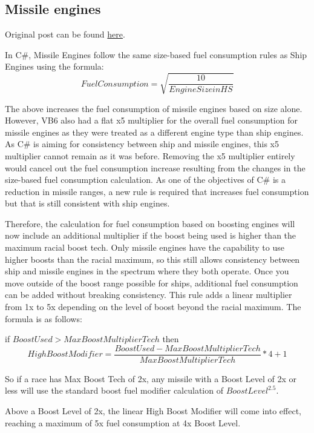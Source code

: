 \documentclass[../Aurora C# unofficial manual.tex]{subfiles}
\begin{document}
	
	\subsection{Missile engines}
	Original post can be found
	\href{http://aurora2.pentarch.org/index.php?topic=8495.msg102804#msg102804}{here}.
	\newline\newline
	
	In C\#, Missile Engines follow the same size-based fuel consumption rules as Ship Engines using the formula:
	\[ Fuel Consumption = \sqrt{\frac{10}{Engine Size in HS}} \]
	
	The above increases the fuel consumption of missile engines based on size alone. However, VB6 also had a flat x5 multiplier for the overall fuel consumption for missile engines as they were treated as a different engine type than ship engines. As C\# is aiming for consistency between ship and missile engines, this x5 multiplier cannot remain as it was before. Removing the x5 multiplier entirely would cancel out the fuel consumption increase resulting from the changes in the size-based fuel consumption calculation. As one of the objectives of C\# is a reduction in missile ranges, a new rule is required that increases fuel consumption but that is still consistent with ship engines.
	
	Therefore, the calculation for fuel consumption based on boosting engines will now include an additional multiplier if the boost being used is higher than the maximum racial boost tech. Only missile engines have the capability to use higher boosts than the racial maximum, so this still allows consistency between ship and missile engines in the spectrum where they both operate. Once you move outside of the boost range possible for ships, additional fuel consumption can be added without breaking consistency. This rule adds a linear multiplier from 1x to 5x depending on the level of boost beyond the racial maximum. The formula is as follows:\newline
	
	if \( Boost Used > Max Boost Multiplier Tech \) then
	\[ High Boost Modifier = \frac{Boost Used - Max Boost Multiplier Tech}{Max Boost Multiplier Tech} * 4 + 1 \]
	
	So if a race has Max Boost Tech of 2x, any missile with a Boost Level of 2x or less will use the standard boost fuel modifier calculation of \( Boost Level^{2.5} \).
	
	Above a Boost Level of 2x, the linear High Boost Modifier will come into effect, reaching a maximum of 5x fuel consumption at 4x Boost Level.
	
\end{document}
